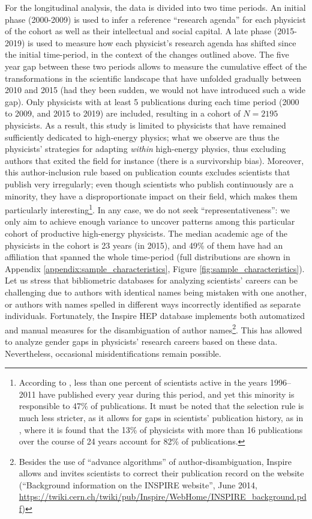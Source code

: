 \documentclass{article}
\begin{document}
For the longitudinal analysis, the data is divided into two time periods. An initial phase (2000-2009) is used to infer a reference ``research agenda'' for each physicist of the cohort as well as their intellectual and social capital. A late phase (2015-2019) is used to measure how each physicist's research agenda has shifted since the initial time-period, in the context of the changes outlined above. The five year gap between these two periods allows to measure the cumulative effect of the transformations in the scientific landscape that have unfolded gradually between 2010 and 2015 (had they been sudden, we would not have introduced such a wide gap). Only physicists with at least 5 publications during each time period (2000 to 2009, and 2015 to 2019) are included, resulting in a cohort of $N=2195$ physicists. As a result, this study is limited to physicists that have remained sufficiently dedicated to high-energy physics; what we observe are thus the physicists' strategies for adapting \textit{within} high-energy physics, thus excluding authors that exited the field for instance (there is a survivorship bias). Moreover, this author-inclusion rule based on publication counts excludes scientists that publish very irregularly; even though scientists who publish continuously are a minority, they have a disproportionate impact on their field, which makes them particularly interesting\footnote{According to  \citet{Ioannidis2014}, less than one percent of scientists active in the years 1996–2011 have published every year during this period, and yet this minority is responsible to 47\% of publications. It must be noted that the selection rule is much less stricter, as it allows for gaps in scientists' publication history, as in \citealt{Feifan2023}, where it is found that the 13\% of physicists with more than 16 publications over the course of 24 years account for 82\% of publications.}. In any case, we do not seek ``representativeness'': we only aim to achieve enough variance to uncover patterns among this particular cohort of productive high-energy physicists. The median academic age of the physicists in the cohort is 23 years (in 2015), and 49\% of them have had an affiliation that spanned the whole time-period (full distributions are shown in Appendix \ref{appendix:sample_characteristics}, Figure \ref{fig:sample_characteristics}). Let us stress that bibliometric databases for analyzing scientists' careers can be challenging due to authors with identical names being mistaken with one another, or authors with names spelled in different ways incorrectly identified as separate individuals. Fortunately, the Inspire HEP database implements both automatized and manual measures for the disambiguation of author names\footnote{Besides the use of ``advance algorithms'' of author-disambiguation, Inspire allows and invites scientists to correct their publication record on the website (``Background	information	on	the	INSPIRE	website'', June 2014, \url{https://twiki.cern.ch/twiki/pub/Inspire/WebHome/INSPIRE_background.pdf})}. %
This has allowed \citet{Strumia2021} to analyze gender gaps in physicists' research careers based on these data. Nevertheless, occasional misidentifications remain possible.
\end{document}
